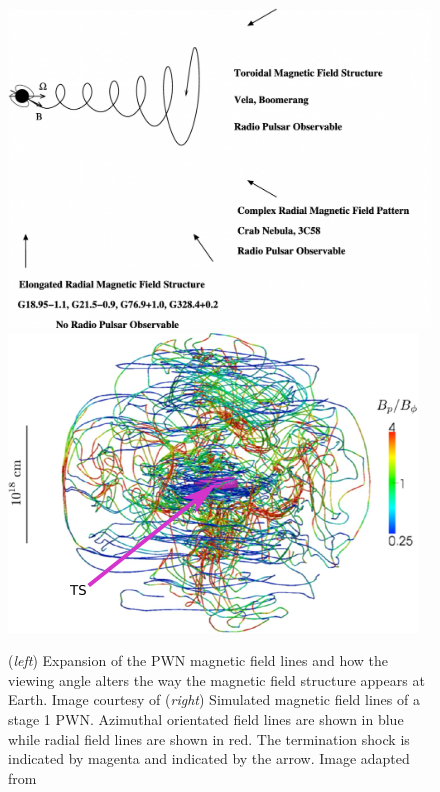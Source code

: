 \begin{figure}[h!]
	\centering
    \includegraphics[height=0.22\textheight]{04_Introduction/Images/pulsar_wind_nebula/magnetic_field_structure.pdf}
	\includegraphics[height=0.22\textheight]{04_Introduction/Images/pulsar_wind_nebula/PWN_magnetic_field_structure.jpeg}
	\caption{(\textit{left}) Expansion of the PWN magnetic field lines and how the viewing angle alters the way the magnetic field structure appears at Earth. Image courtesy of \cite{2006ApJ...638..225K}(\textit{right}) Simulated magnetic field lines of a stage 1 PWN. Azimuthal orientated field lines are shown in blue while radial field lines are shown in red. The termination shock is indicated by magenta and indicated by the arrow. Image adapted from \cite{2014MNRAS.438..278P}}
	\label{fig:chapter1_magnetic_field_structure_PWN}
\end{figure}

